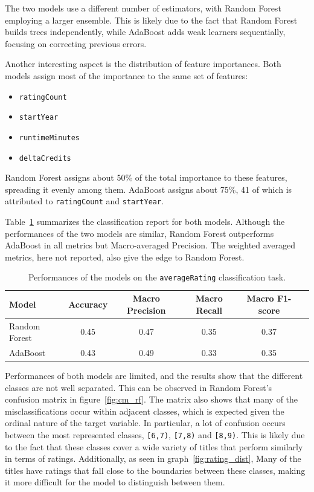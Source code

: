 The two models use a different number of estimators,
with Random Forest employing a larger ensemble.
This is likely due to the fact that Random Forest builds
trees independently, while AdaBoost adds weak learners
sequentially, focusing on correcting previous errors.

Another interesting aspect is the distribution of feature importances.
Both models assign most of the importance to the same set of features:
\begin{itemize}
    \item \texttt{ratingCount}
    \item \texttt{startYear}
    \item \texttt{runtimeMinutes}
    \item \texttt{deltaCredits}
\end{itemize}
Random Forest assigns about 50\% of the total importance to these
features, spreading it evenly among them.
AdaBoost assigns about 75\%, 41 of which is
attributed to \texttt{ratingCount} and \texttt{startYear}.



Table~\ref{tab:report_ensemble} summarizes the
classification report for both models.
Although the performances of the two models are similar,
Random Forest outperforms AdaBoost in all metrics but Macro-averaged
Precision. The weighted averaged metrics, here not reported,
also give the edge to Random Forest.

\begin{table}[H]
    \centering
    \begin{tabular}{lccccc}
    \hline
    \textbf{Model} & \textbf{Accuracy} & \textbf{Macro Precision} & \textbf{Macro Recall} & \textbf{Macro F1-score} \\
    \hline
    Random Forest & 0.45 & 0.47 & 0.35 & 0.37 \\
    AdaBoost & 0.43 & 0.49 & 0.33 & 0.35 \\
    \hline
    \end{tabular}
    \caption{Performances of the models on the \texttt{averageRating} classification task.}
    \label{tab:report_ensemble}
\end{table}
Performances of both models are limited, and the results show that
the different classes are not well separated. This can be observed
in Random Forest's confusion matrix in figure~\ref{fig:cm_rf}.
The matrix also shows that many of the misclassifications occur
within adjacent classes, which is expected given the ordinal
nature of the target variable.
In particular, a lot of confusion occurs between the most
represented classes, \texttt{[6,7)}, \texttt{[7,8)} and
\texttt{[8,9)}. This is likely due to the fact that these classes
cover a wide variety of titles that perform similarly in terms
of ratings. Additionally, as seen in graph~\ref{fig:rating_dist},
Many of the titles have ratings that fall close to the
boundaries between these classes, making it more difficult for the
model to distinguish between them.


